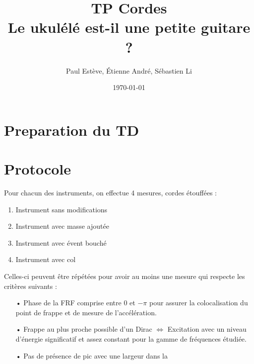 \documentclass[atiam, article]{rapport} %
\title{TP Cordes\\Le ukulélé est-il une petite guitare ?}
\author{Paul Estève, Étienne André, Sébastien Li} %
\date{\today}
\begin{document}
\maketitle

\section{Preparation du TD}

\section{Protocole}

Pour chacun des instruments, on effectue 4 mesures, cordes étouffées :
\begin{enumerate}
    \item Instrument sans modifications
    \item Instrument avec masse ajoutée
    \item Instrument avec évent bouché
    \item Instrument avec col
\end{enumerate}

Celles-ci peuvent être répétées pour avoir au moins une mesure qui respecte les critères suivants :

\begin{itemize}
    \item[•] Phase de la FRF comprise entre $0$ et $-\pi$ pour assurer la colocalisation du point de frappe et de mesure de l'accélération.
    \item[•] Frappe au plus proche possible d'un Dirac $\Leftrightarrow$ Excitation avec un niveau d'énergie significatif et assez constant pour la gamme de fréquences étudiée.
    \item[•] Pas de présence de pic avec une largeur dans la 
\end{itemize}
\end{document}
